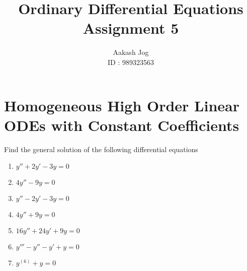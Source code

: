 \documentclass[fleqn, a4paper, 11pt, oneside]{amsart}
\title{Ordinary Differential Equations\\Assignment 5}
\author
{
	Aakash Jog\\
	ID : 989323563
}
\date{\formatdate{18}{5}{2015}}
\theoremstyle{definition}
\theoremstyle{theorem}
\begin{document}
	
\maketitle

\part{Homogeneous High Order Linear ODEs with Constant Coefficients}

\begin{question}
	Find the general solution of the following differential equations
	\begin{enumerate}
		\item $y'' + 2 y' − 3 y = 0$
		\item $4 y'' - 9 y = 0$
		\item $y'' − 2 y' − 3 y = 0$
		\item $4 y'' + 9 y = 0$
		\item $16y'' + 24 y' + 9 y = 0$
		\item $y''' − y'' − y' + y = 0$
		\item $y^{(6)} + y = 0$
	\end{enumerate}
\end{question}
\end{document}
